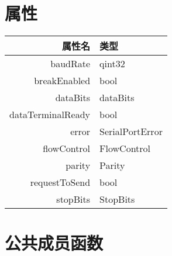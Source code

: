 \section{属性}

\begin{tabular}{|r|l|}
\hline
属性名	& 类型  \\
\hline
baudRate &	qint32 \\ 
\hline
breakEnabled	&bool \\ 
\hline
dataBits&	dataBits \\ 
\hline
dataTerminalReady	&bool \\ 
\hline
error&	SerialPortError \\ 
\hline
flowControl&	FlowControl \\ 
\hline
parity	&Parity \\ 
\hline
requestToSend&	bool \\ 
\hline
stopBits	&StopBits \\ 
\hline
\end{tabular}

\section{公共成员函数}

